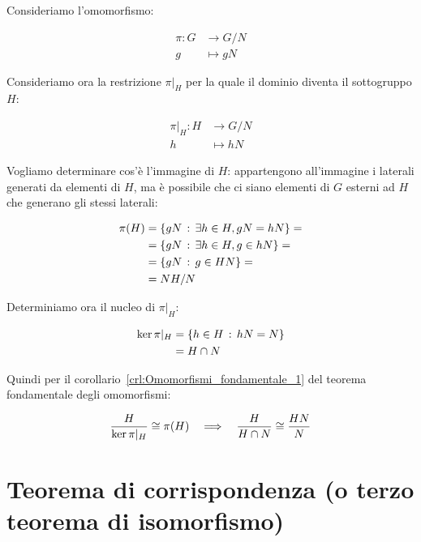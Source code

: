 \begin{dimostrazione}
	Consideriamo l'omomorfismo:
	
	\begin{align}
		\pi: G &\longrightarrow G/N \\
		g &\longmapsto gN
	\end{align}

	Consideriamo ora la restrizione $\pi |_H$ per la quale il dominio diventa il sottogruppo $H$:
	
	\begin{align}
		\pi |_H: H &\longrightarrow G/N \\
		h &\longmapsto hN
	\end{align}

	Vogliamo determinare cos'è l'immagine di $H$: appartengono all'immagine i laterali generati da elementi di $H$, ma è possibile che ci siano elementi di $G$ esterni ad $H$ che generano gli stessi laterali:
	
	\begin{align}
		\pi(H) &= \{gN \,:\, \exists h \in H, gN = hN \} = \\
		&= \{gN \,:\, \exists h \in H, g \in hN\} = \\
		&= \{gN \,:\, g \in HN\} = \\
		&= NH/N
	\end{align}

	Determiniamo ora il nucleo di $\pi |_H$:
	
	\begin{align}
		\ker \pi |_H &= \{h \in H \,:\, hN = N\} \\
		&= H \cap N
	\end{align}

	Quindi per il corollario~\ref{crl:Omomorfismi_fondamentale_1}  del teorema fondamentale degli omomorfismi:
	
	\begin{equation}
		\dfrac{H}{\ker \pi |_H} \cong \pi(H) \quad\Longrightarrow\quad \dfrac{H}{H \cap N} \cong \dfrac{HN}{N}
	\end{equation}

\end{dimostrazione}

\section[Teorema di corrispondenza]{Teorema di corrispondenza (o terzo teorema di isomorfismo)}

